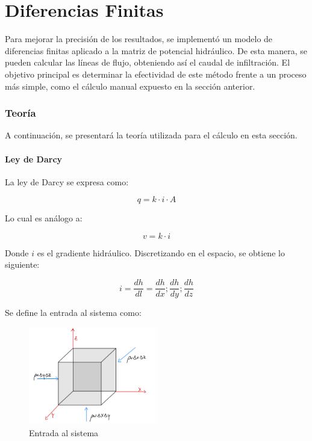 \part{Diferencias Finitas}

Para mejorar la precisión de los resultados, se implementó un modelo de diferencias finitas aplicado a la matriz de potencial hidráulico. De esta manera, se pueden calcular las líneas de flujo, obteniendo así el caudal de infiltración. El objetivo principal es determinar la efectividad de este método frente a un proceso más simple, como el cálculo manual expuesto en la sección anterior.

\section{Teoría}

A continuación, se presentará la teoría utilizada para el cálculo en esta sección.

\subsection{Ley de Darcy}

La ley de Darcy se expresa como:

\begin{equation}
    q = k \cdot i \cdot A
\end{equation}

Lo cual es análogo a:

\begin{equation}
    v = k \cdot i
\end{equation}

Donde \(i\) es el gradiente hidráulico. Discretizando en el espacio, se obtiene lo siguiente:

\begin{equation}
    i = \frac{dh}{dl} = \frac{dh}{dx}; \frac{dh}{dy}; \frac{dh}{dz}
\end{equation}

Se define la entrada al sistema como:

\begin{figure}[H]
    \centering
    \includegraphics[width=0.5\textwidth]{FOTOS/in.jpg}
    \caption{Entrada al sistema}
    \label{fig:ley_darcy_in}
\end{figure}

